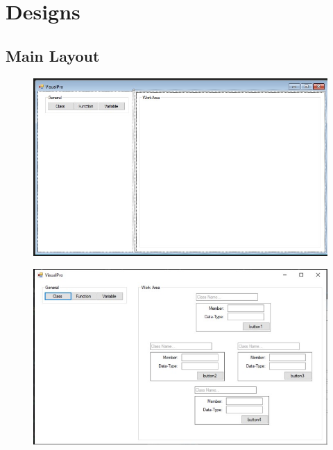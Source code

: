 \documentclass[12pt]{report} %
\begin{document}
		\section{Designs}
			\subsection{Main Layout}
				\begin{figure}[H]
					{\includegraphics[scale=0.45]{Figures/vp-designs/NET_Framework-GUI-1.jpg}}
				\end{figure}

				\begin{figure}[H]
					{\includegraphics[scale=0.45]{Figures/vp-designs/NET_Framework-GUI-2-1.jpg}}
				\end{figure}
\end{document}

